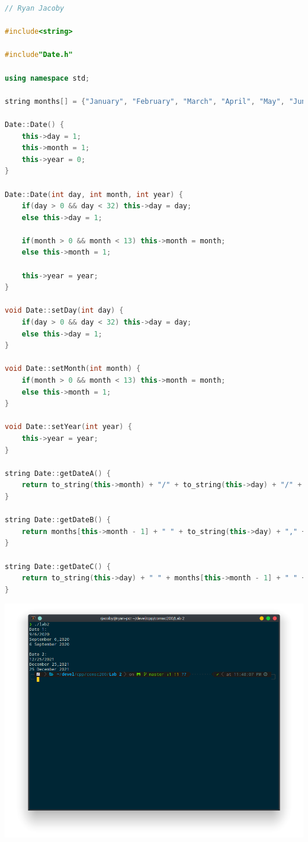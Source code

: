 \documentclass[letterpaper, 11pt]{article}
\begin{document}
\begin{lstlisting}[language=C++, caption=CoinImp.cpp]
// Ryan Jacoby

#include<string>

#include"Date.h"

using namespace std;

string months[] = {"January", "February", "March", "April", "May", "June", "July", "August", "September", "October", "November", "December"};

Date::Date() {
    this->day = 1;
    this->month = 1;
    this->year = 0;
}

Date::Date(int day, int month, int year) {
    if(day > 0 && day < 32) this->day = day;
    else this->day = 1;

    if(month > 0 && month < 13) this->month = month;
    else this->month = 1;

    this->year = year;
}

void Date::setDay(int day) {
    if(day > 0 && day < 32) this->day = day;
    else this->day = 1;
}

void Date::setMonth(int month) {
    if(month > 0 && month < 13) this->month = month;
    else this->month = 1;
}

void Date::setYear(int year) {
    this->year = year;
}

string Date::getDateA() {
    return to_string(this->month) + "/" + to_string(this->day) + "/" + to_string(this->year);
}

string Date::getDateB() {
    return months[this->month - 1] + " " + to_string(this->day) + "," + to_string(this->year);
}

string Date::getDateC() {
    return to_string(this->day) + " " + months[this->month - 1] + " " + to_string(this->year);
}
\end{lstlisting}

\includegraphics[scale=0.5]{date_run.png} 
\end{document}
